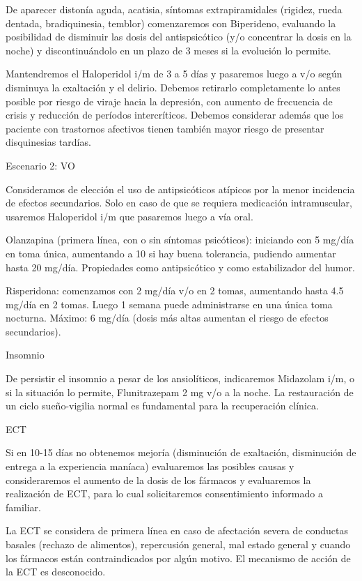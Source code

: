 De aparecer distonía aguda, acatisia, síntomas extrapiramidales (rigidez, rueda dentada, bradiquinesia, temblor) comenzaremos con Biperideno, evaluando la posibilidad de disminuir las dosis del antispsicótico (y/o concentrar la dosis en la noche) y discontinuándolo en un plazo de 3 meses si la evolución lo permite.

Mantendremos el Haloperidol i/m de 3 a 5 días y pasaremos luego a v/o según disminuya la exaltación y el delirio. Debemos retirarlo completamente lo antes posible por riesgo de viraje hacia la depresión, con aumento de frecuencia de crisis y reducción de períodos intercríticos. Debemos considerar además que los paciente con trastornos afectivos tienen también mayor riesgo de presentar disquinesias tardías.

Escenario 2: VO

Consideramos de elección el uso de antipsicóticos atípicos por la menor incidencia de efectos secundarios. Solo en caso de que se requiera medicación intramuscular, usaremos Haloperidol i/m que pasaremos luego a vía oral.

Olanzapina (primera línea, con o sin síntomas psicóticos): iniciando con 5 mg/día en toma única, aumentando a 10 si hay buena tolerancia, pudiendo aumentar hasta 20 mg/día. Propiedades como antipsicótico y como estabilizador del humor.

Risperidona: comenzamos con 2 mg/día v/o en 2 tomas, aumentando hasta 4.5 mg/día en 2 tomas. Luego 1 semana puede administrarse en una única toma nocturna. Máximo: 6 mg/día (dosis más altas aumentan el riesgo de efectos secundarios).

\faMedkit Insomnio

De persistir el insomnio a pesar de los ansiolíticos, indicaremos Midazolam i/m, o si la situación lo permite, Flunitrazepam 2 mg v/o a la noche. La restauración de un ciclo sueño-vigilia normal es fundamental para la recuperación clínica.

\faBolt ECT

Si en 10-15 días no obtenemos mejoría (disminución de exaltación, disminución de entrega a la experiencia maníaca) evaluaremos las posibles causas y consideraremos el aumento de la dosis de los fármacos y evaluaremos la realización de ECT, para lo cual solicitaremos consentimiento informado a familiar.

La ECT se considera de primera línea en caso de afectación severa de conductas basales (rechazo de alimentos), repercusión general, mal estado general y cuando los fármacos están contraindicados por algún motivo. El mecanismo de acción de la ECT es desconocido.

